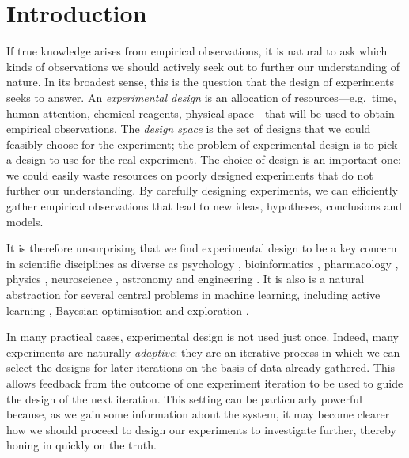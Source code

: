 \documentclass[a4paper, 10pt]{report}
\theoremstyle{plain}
\begin{document}
	\section{Introduction}
	If true knowledge arises from empirical observations, it is natural to ask which kinds of observations we should actively seek out to further our understanding of nature.
	In its broadest sense, this is the question that the design of experiments seeks to answer.
	An \emph{experimental design} is an allocation of resources---e.g.~time, human attention, chemical reagents, physical space---that will be used to obtain empirical observations.
	The \emph{design space} is the set of designs that we could feasibly choose for the experiment; the problem of experimental design is to pick a design to use for the real experiment.
	The choice of design is an important one: we could easily waste resources on poorly designed experiments that do not further our understanding.
	By carefully designing experiments, we can efficiently gather empirical observations that lead to new ideas, hypotheses, conclusions and models.
	
	It is therefore unsurprising that we find experimental design to be a key concern in scientific disciplines as diverse as psychology \citep{myung2013}, bioinformatics \citep{vanlier2012}, pharmacology \citep{lyu2019ultra}, physics \citep{dushenko2020sequential}, neuroscience \citep{shababo2013bayesian}, astronomy \citep{loredo2004bayesian} and engineering \citep{papadimitriou2004optimal}.
	It is also is a natural abstraction for several central problems in machine learning, including active learning \citep{houlsby2011bayesian,gal2017deep}, Bayesian optimisation \citep{hernandez2014,shahriari2015taking} and exploration \citep{sun2011planning,shyam2019model}.
	
	
	In many practical cases, experimental design is not used just once.
	Indeed, many experiments are naturally \emph{adaptive}: they are an iterative process in which we can select the designs for later iterations on the basis of data already gathered. 
	This allows feedback from the outcome of one experiment iteration to be used to guide the design of the next iteration.
	This setting can be particularly powerful because, as we gain some information about the system, it may become clearer how we should proceed to design our experiments to investigate further, thereby honing in quickly on the truth.
	
\end{document}
